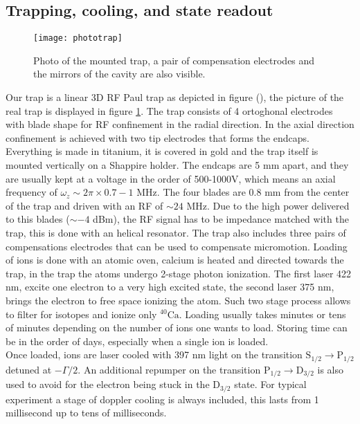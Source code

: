\subsection{Trapping, cooling, and state readout}
\begin{figure}
\centering
\texttt{[image: phototrap]}
\caption{Photo of the mounted trap, a pair of compensation electrodes and the mirrors of the cavity are also visible.}
\label{trapphoto}
\end{figure}
Our trap is a linear 3D RF Paul trap as depicted in figure (), the picture of the real trap is displayed in figure \ref{trapphoto}. The trap consists of 4 ortoghonal electrodes with blade shape for RF confinement in the radial direction. In the axial direction confinement is achieved with two tip electrodes that forms the endcaps. Everything is made in titanium, it is covered in gold and the trap itself is mounted vertically on a Shappire holder. The endcaps are 5 mm apart, and they are usually kept at a voltage in the order of 500-1000V, which means an axial frequency of $\omega_z \sim 2\pi \times 0.7-1$ MHz. The four blades are 0.8 mm from the center of the trap and driven with an RF of $\sim 24$ MHz. Due to the high power delivered to this blades ($\sim-4$ dBm), the RF signal has to be impedance matched with the trap, this is done with an helical resonator.
The trap also includes three pairs of compensations electrodes that can be used to compensate micromotion.
Loading of ions is done with an atomic oven, calcium is heated and directed towards the trap, in the trap the atoms undergo 2-stage photon ionization. The first laser 422 nm, excite one electron to a very high excited state, the second laser 375 nm, brings the electron to free space ionizing the atom. Such two stage process allows to filter for isotopes and ionize only $^{40}\text{Ca}$. Loading usually takes minutes or tens of minutes depending on the number of ions one wants to load. Storing time can be in the order of days, especially when a single ion is loaded.\\
Once loaded, ions are laser cooled with 397 nm light on the transition $\text{S}_{1/2} \to \text{P}_{1/2}$ detuned at $-\Gamma/2$. An additional repumper on the transition $\text{P}_{1/2} \to \text{D}_{3/2}$ is also used to avoid for the electron being stuck in the $\text{D}_{3/2}$ state. For typical experiment a stage of doppler cooling is always included, this lasts from 1 millisecond up to tens of milliseconds.\\
